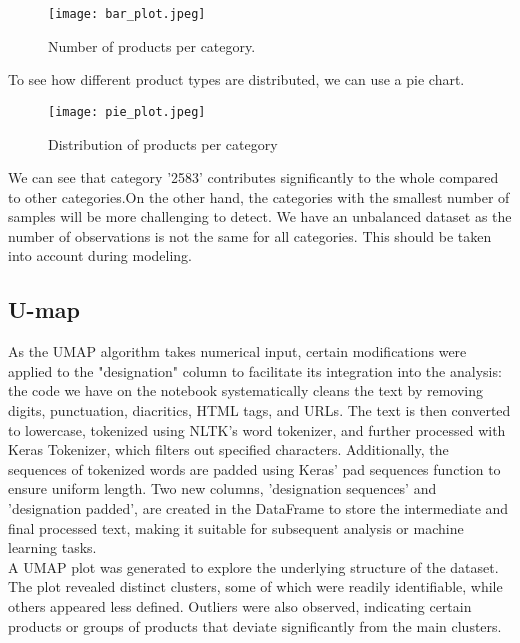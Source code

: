 \newpage

\begin{figure}[h]
    \centering
    \texttt{[image: bar\_plot.jpeg]}
    \caption{Number of products per category.}
    \label{fig:nproduct}
\end{figure}


To see how different product types are distributed, we can use a pie chart. \\

\begin{figure}[h]
    \centering
    \texttt{[image: pie\_plot.jpeg]}
    \caption{Distribution of products per category}
    \label{fig:product}
\end{figure}


We can see that category '2583' contributes significantly to the whole compared to other categories.On the other hand, the categories with the smallest number of samples will be more challenging to detect. We have an unbalanced dataset as the number of observations is not the same for all categories. This should be taken into account during modeling.

\newpage
\subsection{U-map}

As the UMAP algorithm takes numerical input, certain modifications were applied to the "designation" column to facilitate its integration into the analysis:  the code we have on the notebook systematically cleans the text by removing digits, punctuation, diacritics, HTML tags, and URLs. The text is then converted to lowercase, tokenized using NLTK's word tokenizer, and further processed with Keras Tokenizer, which filters out specified characters. Additionally, the sequences of tokenized words are padded using Keras' pad sequences function to ensure uniform length. Two new columns, 'designation sequences' and 'designation padded', are created in the DataFrame to store the intermediate and final processed text, making it suitable for subsequent analysis or machine learning tasks. \\

A UMAP plot was generated to explore the underlying structure of the dataset. The plot revealed distinct clusters, some of which were readily identifiable, while others appeared less defined. Outliers were also observed, indicating certain products or groups of products that deviate significantly from the main clusters.

